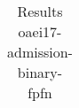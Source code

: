 \begin{table}[htb]
{\begin{tabular}[tb]{llllllllllllllllllllllllllllllllllllllll}
\end{tabular}

}

\caption{Results oaei17-admission-binary-fpfn}

\label{tbl:results}

\end{table}